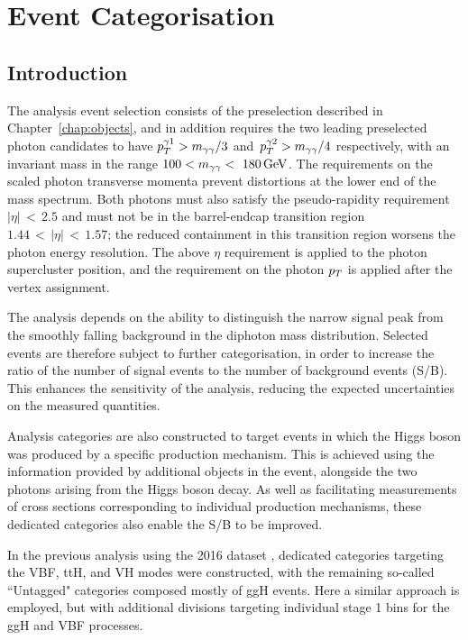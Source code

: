 \chapter{Event Categorisation}
\label{chap:categorisation}

\section{Introduction}

\sloppy The analysis event selection consists of the preselection described in Chapter~\ref{chap:objects}, 
and in addition requires the two leading preselected photon candidates to have 
${p_T^{\gamma 1} > m_{\gamma\gamma}/3}$ and~${p_T^{\gamma 2} > m_{\gamma\gamma} /4}$ respectively, 
with an invariant mass in the range $100 < m_{\gamma\gamma} <~\SI{180}{GeV}$. 
The requirements on the scaled photon transverse momenta prevent distortions 
at the lower end of the mass spectrum.
Both photons must also satisfy the
pseudo-rapidity requirement $|\eta|\,<\,2.5$ and must not be in the barrel-endcap
transition region $1.44\,<\,|\eta|\,<\,1.57$;
the reduced containment in this transition region worsens the photon energy resolution.
The above $\eta$ requirement is applied to the photon supercluster
position, and the requirement on the photon $p_T$ is applied 
after the vertex assignment.

The \Hgg analysis depends on the ability to distinguish the narrow signal peak 
from the smoothly falling background in the diphoton mass distribution. 
Selected events are therefore subject to further categorisation, in order to 
increase the ratio of the number of signal events to the number of background events (S/B).
This enhances the sensitivity of the analysis, 
reducing the expected uncertainties on the measured quantities.

Analysis categories are also constructed to target events in which the Higgs boson was 
produced by a specific production mechanism. 
This is achieved using the information provided by additional objects in the event, 
alongside the two photons arising from the Higgs boson decay.
As well as facilitating measurements of cross sections corresponding 
to individual production mechanisms, these dedicated categories also enable the S/B to be improved.

In the previous \Hgg analysis using the 2016 dataset \cite{HIG-16-040}, 
dedicated categories targeting the VBF, ttH, and VH modes were constructed, 
with the remaining so-called ``Untagged" categories composed mostly of ggH events.
Here a similar approach is employed, 
but with additional divisions targeting individual stage 1 bins for the ggH and VBF processes.

